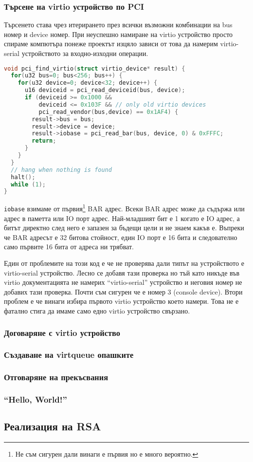 \subsubsection{Търсене на virtio устройство по PCI}
Търсенето става чрез итерирането през всички възможни комбинации на bus номер и device номер. При неуспешно намиране на virtio устройство просто спираме компютъра понеже проектът изцяло зависи от това да намерим virtio-serial устройството за входно-изходни операции.
\begin{lstlisting}[language=C]
void pci_find_virtio(struct virtio_device* result) {
  for(u32 bus=0; bus<256; bus++) {
    for(u32 device=0; device<32; device++) {
      u16 deviceid = pci_read_deviceid(bus, device);
      if (deviceid >= 0x1000 &&
          deviceid <= 0x103F && // only old virtio devices
          pci_read_vendor(bus,device) == 0x1AF4) {
        result->bus = bus;
        result->device = device;
        result->iobase = pci_read_bar(bus, device, 0) & 0xFFFC;
        return;
      }
    }
  }
  // hang when nothing is found
  halt();
  while (1);
}
\end{lstlisting}
{\tt iobase} взимаме от първия\footnote{Не съм сигурен дали винаги е първия но е много вероятно.} BAR адрес. Всеки BAR адрес може да съдържа или адрес в паметта или IO порт адрес. Най-младшият бит е 1 когато е IO адрес, а битът директно след него е запазен за бъдещи цели и не знаем какъв е. Въпреки че BAR адресът е 32 битова стойност, един IO порт е 16 бита и следователно само първите 16 бита от адреса ни трябват.

Един от проблемите на този код е че не проверява дали типът на устройството е virtio-serial устройство. Лесно се добавя тази проверка но тъй като никъде във virtio документацията не намерих ``virtio-serial'' устройство и неговия номер не добавих тази проверка. Почти съм сигурен че е номер 3 (console device).
Втори проблем е че винаги избира първото virtio устройство което намери. Това не е фатално стига да имаме само едно virtio устройство свързано.

\subsubsection{Договаряне с virtio устройство}

\subsubsection{Създаване на virtqueue опашките}

\subsubsection{Отговаряне на прекъсвания}

\subsubsection{``Hello, World!''}

\subsection{Реализация на RSA}

